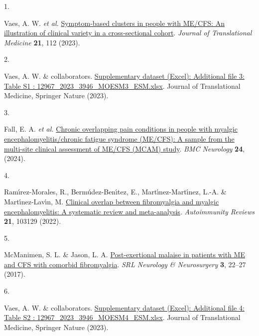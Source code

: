 \documentclass[
  letterpaper,
  DIV=11,
  numbers=noendperiod]{scrartcl}
\newlength{\cslhangindent}
\newlength{\csllabelwidth}
\newenvironment{CSLReferences}[2] %
 {\begin{list}{}{%
  \setlength{\itemindent}{0pt}
  \setlength{\leftmargin}{0pt}
  \setlength{\parsep}{0pt}
  \ifodd #1
   \setlength{\leftmargin}{\cslhangindent}
   \setlength{\itemindent}{-1\cslhangindent}
  \fi
  \setlength{\itemsep}{#2\baselineskip}}}
 {\end{list}}
\newcommand{\CSLLeftMargin}[1]{\parbox[t]{\csllabelwidth}{\strut#1\strut}}
\newcommand{\CSLRightInline}[1]{\parbox[t]{\linewidth - \csllabelwidth}{\strut#1\strut}}
\begin{document}
\label{refs}
\begin{CSLReferences}{0}{0}
\CSLLeftMargin{1. }%
\CSLRightInline{Vaes, A. W. \emph{et al.}
\href{https://doi.org/10.1186/s12967-023-03946-6}{Symptom-based clusters
in people with ME/CFS: An illustration of clinical variety in a
cross-sectional cohort}. \emph{Journal of Translational Medicine}
\textbf{21}, 112 (2023).}

\CSLLeftMargin{2. }%
\CSLRightInline{Vaes, A. W. \& collaborators.
\href{https://static-content.springer.com/esm/art\%3A10.1186\%2Fs12967-023-03946-6/MediaObjects/12967_2023_3946_MOESM3_ESM.xlsx}{Supplementary
dataset ({Excel}): Additional file 3: Table S1 :
12967\_2023\_3946\_MOESM3\_ESM.xlsx}. Journal of Translational Medicine,
Springer Nature (2023).}

\CSLLeftMargin{3. }%
\CSLRightInline{Fall, E. A. \emph{et al.}
\href{https://doi.org/10.1186/s12883-024-03872-0}{Chronic overlapping
pain conditions in people with myalgic encephalomyelitis/chronic fatigue
syndrome (ME/CFS): A sample from the multi-site clinical assessment of
ME/CFS (MCAM) study}. \emph{BMC Neurology} \textbf{24}, (2024).}

\CSLLeftMargin{4. }%
\CSLRightInline{Ramı́rez-Morales, R., Bermúdez-Benı́tez, E.,
Martı́nez-Martı́nez, L.-A. \& Martı́nez-Lavı́n, M.
\href{https://doi.org/10.1016/j.autrev.2022.103129}{Clinical overlap
between fibromyalgia and myalgic encephalomyelitis: A systematic review
and meta-analysis}. \emph{Autoimmunity Reviews} \textbf{21}, 103129
(2022).}

\CSLLeftMargin{5. }%
\CSLRightInline{McManimen, S. L. \& Jason, L. A.
\href{https://www.ncbi.nlm.nih.gov/pmc/articles/PMC5464757}{Post-exertional
malaise in patients with ME and CFS with comorbid fibromyalgia}.
\emph{SRL Neurology \& Neurosurgery} \textbf{3}, 22--27 (2017).}

\CSLLeftMargin{6. }%
\CSLRightInline{Vaes, A. W. \& collaborators.
\href{https://static-content.springer.com/esm/art\%3A10.1186\%2Fs12967-023-03946-6/MediaObjects/12967_2023_3946_MOESM4_ESM.xlsx}{Supplementary
dataset ({Excel}): Additional file 4: Table S2 :
12967\_2023\_3946\_MOESM4\_ESM.xlsx}. Journal of Translational Medicine,
Springer Nature (2023).}

\end{CSLReferences}
\end{document}
